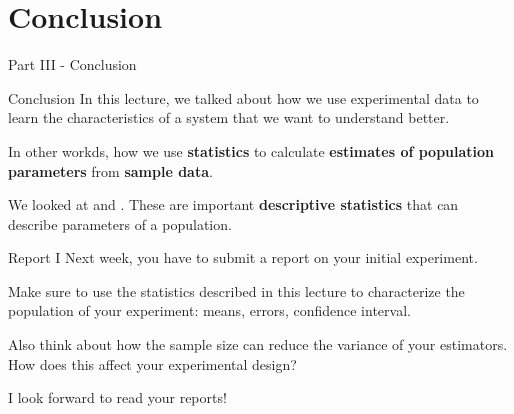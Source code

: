 
\section{Conclusion}
\begin{frame}
  \begin{center}
    Part III - Conclusion
  \end{center}
\end{frame}

\begin{frame}{Conclusion}
  In this lecture, we talked about how we use experimental data to learn the characteristics of a system that we want to understand better.\bigskip

  In other workds, how we use {\bf statistics} to calculate {\bf estimates of population parameters} from {\bf sample data}.\bigskip

  We looked at  and . These are important {\bf descriptive statistics} that can describe parameters of a population.
\end{frame}

\begin{frame}{Report I}
  Next week, you have to submit a report on your initial experiment.\bigskip

  Make sure to use the statistics described in this lecture to characterize the population of your experiment: means, errors, confidence interval.\bigskip

  Also think about how the sample size can reduce the variance of your estimators. How does this affect your experimental design?
  \bigskip

  I look forward to read your reports!
\end{frame}

